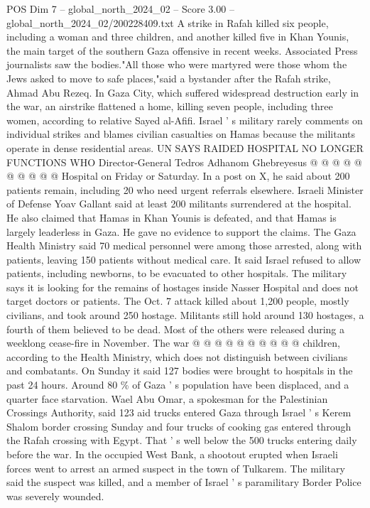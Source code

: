 \begin{textsample}{POS Dim 7 – global\_north\_2024\_02 – Score 3.00 – global\_north\_2024\_02/200228409.txt}
A strike in Rafah killed six people, including a woman and three children, and another killed five in Khan Younis, the main target of the southern Gaza offensive in recent weeks.
Associated Press journalists saw the bodies."All those who were martyred were those whom the Jews asked to move to safe places,"said a bystander after the Rafah strike, Ahmad Abu Rezeq.
In Gaza City, which suffered widespread destruction early in the war, an airstrike flattened a home, killing seven people, including three women, according to relative Sayed al-Afifi.
Israel ' s military rarely comments on individual strikes and blames civilian casualties on Hamas because the militants operate in dense residential areas.
UN SAYS RAIDED HOSPITAL NO LONGER FUNCTIONS WHO Director-General Tedros Adhanom Ghebreyesus @ @ @ @ @ @ @ @ @ @ Hospital on Friday or Saturday.
In a post on X, he said about 200 patients remain, including 20 who need urgent referrals elsewhere.
Israeli Minister of Defense Yoav Gallant said at least 200 militants surrendered at the hospital.
He also claimed that Hamas in Khan Younis is defeated, and that Hamas is largely leaderless in Gaza.
He gave no evidence to support the claims.
The Gaza Health Ministry said 70 medical personnel were among those arrested, along with patients, leaving 150 patients without medical care.
It said Israel refused to allow patients, including newborns, to be evacuated to other hospitals.
The military says it is looking for the remains of hostages inside Nasser Hospital and does not target doctors or patients.
The Oct. 7 attack killed about 1,200 people, mostly civilians, and took around 250 hostage.
Militants still hold around 130 hostages, a fourth of them believed to be dead.
Most of the others were released during a weeklong cease-fire in November.
The war @ @ @ @ @ @ @ @ @ @ children, according to the Health Ministry, which does not distinguish between civilians and combatants.
On Sunday it said 127 bodies were brought to hospitals in the past 24 hours.
Around 80 \% of Gaza ' s population have been displaced, and a quarter face starvation.
Wael Abu Omar, a spokesman for the Palestinian Crossings Authority, said 123 aid trucks entered Gaza through Israel ' s Kerem Shalom border crossing Sunday and four trucks of cooking gas entered through the Rafah crossing with Egypt.
That ' s well below the 500 trucks entering daily before the war.
In the occupied West Bank, a shootout erupted when Israeli forces went to arrest an armed suspect in the town of Tulkarem.
The military said the suspect was killed, and a member of Israel ' s paramilitary Border Police was severely wounded.

\end{textsample}
